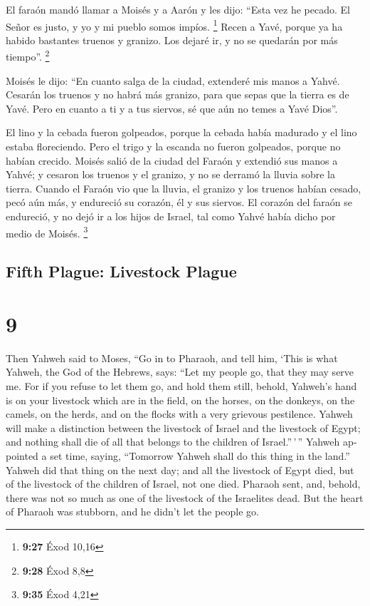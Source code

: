 \begin{paracol}{2}
 El faraón mandó llamar a Moisés y a Aarón y les dijo:
``Esta vez he pecado. El Señor es justo, y yo y mi pueblo somos impíos.
\footnote{\textbf{9:27} Éxod 10,16}  Recen a Yavé, porque
ya ha habido bastantes truenos y granizo. Los dejaré ir, y no se
quedarán por más tiempo''. \footnote{\textbf{9:28} Éxod 8,8}

 Moisés le dijo: ``En cuanto salga de la ciudad,
extenderé mis manos a Yahvé. Cesarán los truenos y no habrá más granizo,
para que sepas que la tierra es de Yavé.  Pero en cuanto
a ti y a tus siervos, sé que aún no temes a Yavé Dios''.

 El lino y la cebada fueron golpeados, porque la cebada
había madurado y el lino estaba floreciendo.  Pero el
trigo y la escanda no fueron golpeados, porque no habían crecido.
 Moisés salió de la ciudad del Faraón y extendió sus
manos a Yahvé; y cesaron los truenos y el granizo, y no se derramó la
lluvia sobre la tierra.  Cuando el Faraón vio que la
lluvia, el granizo y los truenos habían cesado, pecó aún más, y
endureció su corazón, él y sus siervos.  El corazón del
faraón se endureció, y no dejó ir a los hijos de Israel, tal como Yahvé
había dicho por medio de Moisés. \footnote{\textbf{9:35} Éxod 4,21}

\switchcolumn
\begin{otherlanguage}{english}

\hypertarget{fifth-plague-livestock-plague}{%
\subsection{Fifth Plague: Livestock
Plague}\label{fifth-plague-livestock-plague}}

\hypertarget{section-17}{%
\section{9}\label{section-17}}

 Then Yahweh said to Moses, ``Go in to Pharaoh, and tell
him, `This is what Yahweh, the God of the Hebrews, says: ``Let my people
go, that they may serve me.  For if you refuse to let them
go, and hold them still,  behold, Yahweh's hand is on your
livestock which are in the field, on the horses, on the donkeys, on the
camels, on the herds, and on the flocks with a very grievous pestilence.
 Yahweh will make a distinction between the livestock of
Israel and the livestock of Egypt; and nothing shall die of all that
belongs to the children of Israel.''\,'\,''  Yahweh
appointed a set time, saying, ``Tomorrow Yahweh shall do this thing in
the land.''  Yahweh did that thing on the next day; and
all the livestock of Egypt died, but of the livestock of the children of
Israel, not one died.  Pharaoh sent, and, behold, there
was not so much as one of the livestock of the Israelites dead. But the
heart of Pharaoh was stubborn, and he didn't let the people go.


\end{otherlanguage}
\end{paracol}
